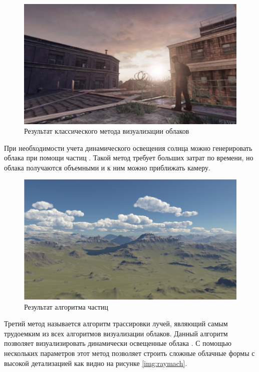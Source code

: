 \begin{figure}[H]
    \centering
    \includegraphics[scale=0.4]{img/result_cloud_sphere.png}
    \caption{Результат классического метода визуализации облаков}
    \label{img:result_sphere}
\end{figure}

При необходимости учета динамического освещения солнца можно генерировать облака при помощи частиц \cite{hpg.20141101}.
Такой метод требует больших затрат по времени, но облака получаются объемными и к ним можно приближать камеру.

\begin{figure}[H]
    \centering
    \includegraphics[scale=0.4]{img/ysov.png}
    \caption{Результат алгоритма частиц}
    \label{img:ysov}
\end{figure}

Третий метод называется алгоритм трассировки лучей, являющий самым трудоемким из всех алгоритмов
визуализации облаков. Данный алгоритм позволяет визуализировать динамически освещенные
облака \cite{Sch16}. С помощью нескольких параметров этот метод позволяет строить сложные облачные
формы с высокой детализацией как видно на рисунке \ref{img:raymach}.

